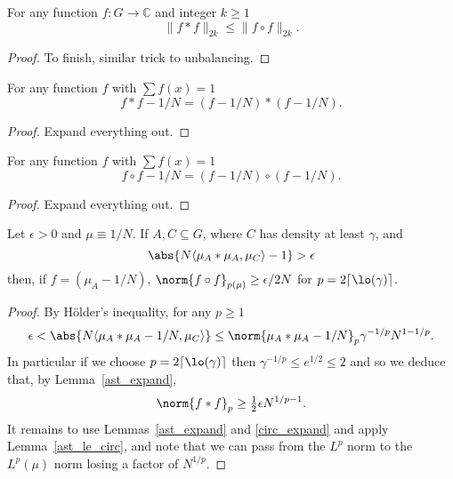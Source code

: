 \begin{lemma}
\label{ast_le_circ}
\leanok
For any function $f:G\to \mathbb{C}$ and integer $k\geq 1$
\[\| f\ast f\|_{2k}\leq \| f\circ f\|_{2k}.\]
\end{lemma}

\begin{proof}
\leanok
To finish, similar trick to unbalancing.
\end{proof}


\begin{lemma}\label{ast_expand}
\leanok
For any function $f$ with $\sum f(x)=1$
\[f\ast f-1/N = (f-1/N)\ast (f-1/N).\]
\end{lemma}

\begin{proof}
\leanok
Expand everything out.
\end{proof}


\begin{lemma}\label{circ_expand}
\leanok
For any function $f$ with $\sum f(x)=1$
\[f\circ f-1/N = (f-1/N)\circ (f-1/N).\]
\end{lemma}

\begin{proof}
\leanok
Expand everything out.
\end{proof}


\begin{lemma}
\label{global_dichotomy}
\leanok
Let $\epsilon >0$ and $\mu\equiv 1/N$. If $A,C\subseteq G$, where $C$ has density at least $\gamma$, and
\[\abs{N\langle \mu_A\ast \mu_A,\mu_C\rangle -1}>\epsilon\]
then, if $f=(\mu_A-1/N)$, $\norm{f\circ f}_{p(\mu)} \geq \epsilon /2N$ for $p=2\lceil \lo(\gamma)\rceil$.
\end{lemma}

\begin{proof}
\leanok
By H\"{o}lder's inequality, for any $p\geq 1$
\[\epsilon < \abs{ N\langle \mu_A \ast \mu_A - 1/N, \mu_C \rangle } \leq \norm{\mu_A\ast \mu_A-1/N}_p\gamma^{-1/p}N^{1-1/p}.\]
In particular if we choose $p=2\lceil\lo(\gamma)\rceil$ then $\gamma^{-1/p}\leq e^{1/2}\leq 2$ and so we deduce that, by Lemma~\ref{ast_expand},
\[\norm{f\ast f}_{p}\geq \tfrac{1}{2}\epsilon N^{1/p-1}.\]
It remains to use Lemmas~\ref{ast_expand} and \ref{circ_expand} and apply Lemma~\ref{ast_le_circ}, and note that we can pass from the $L^p$ norm to the $L^p(\mu)$ norm losing a factor of $N^{1/p}$.
\end{proof}


